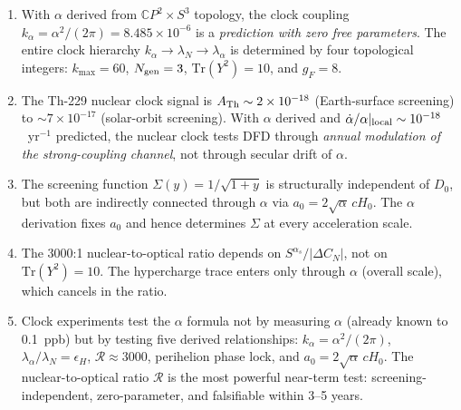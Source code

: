 \documentclass[11pt]{article}
\newcommand{\kalpha}{k_\alpha}
\theoremstyle{definition}
\theoremstyle{remark}
\begin{document}
\begin{enumerate}
\item With $\alpha$ derived from $\mathbb{C}P^2 \times S^3$ topology, the
  clock coupling $\kalpha = \alpha^2/(2\pi) = 8.485 \times 10^{-6}$ is a
  \emph{prediction with zero free parameters}. The entire clock hierarchy
  $\kalpha \to \lambda_N \to \lambda_\alpha$ is determined by four
  topological integers: $k_{\max} = 60$, $N_{\rm gen} = 3$,
  $\mathrm{Tr}(Y^2) = 10$, and $g_F = 8$.

\item The Th-229 nuclear clock signal is $A_{\rm Th} \sim 2 \times 10^{-18}$
  (Earth-surface screening) to $\sim 7 \times 10^{-17}$ (solar-orbit
  screening). With $\alpha$ derived and $\dot\alpha/\alpha|_{\rm local}
  \sim 10^{-18}$~yr$^{-1}$ predicted, the nuclear clock tests DFD through
  \emph{annual modulation of the strong-coupling channel}, not through
  secular drift of $\alpha$.

\item The screening function $\Sigma(y) = 1/\sqrt{1+y}$ is structurally
  independent of $D_0$, but both are indirectly connected through $\alpha$
  via $a_0 = 2\sqrt{\alpha}\,cH_0$. The $\alpha$ derivation fixes $a_0$
  and hence determines $\Sigma$ at every acceleration scale.

\item The 3000:1 nuclear-to-optical ratio depends on
  $S^{\alpha_s}/|\Delta C_N|$, not on $\mathrm{Tr}(Y^2) = 10$.
  The hypercharge trace enters only through $\alpha$ (overall scale),
  which cancels in the ratio.

\item Clock experiments test the $\alpha$ formula not by measuring $\alpha$
  (already known to 0.1~ppb) but by testing five derived relationships:
  $\kalpha = \alpha^2/(2\pi)$, $\lambda_\alpha/\lambda_N = \epsilon_H$,
  $\mathcal{R} \approx 3000$, perihelion phase lock, and
  $a_0 = 2\sqrt{\alpha}\,cH_0$. The nuclear-to-optical ratio
  $\mathcal{R}$ is the most powerful near-term test: screening-independent,
  zero-parameter, and falsifiable within 3--5 years.
\end{enumerate}
\end{document}
